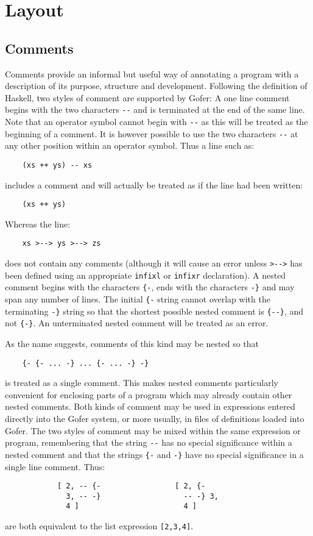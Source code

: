 \chapter{Layout}

\section{Comments}
Comments provide an informal but useful way  of  annotating  a  program
with  a  description  of  its  purpose,  structure   and   development.
Following  the  definition  of  Haskell,  two  styles  of  comment  are
supported by Gofer:
\BI
\IT  A one line comment begins with the  two  characters  \verb"--"  and  is
     terminated at the end of the same line.   Note  that  an  operator
     symbol cannot begin with \verb"--" as  this  will  be  treated  as  the
     beginning of a comment.  It is however possible  to  use  the  two
     characters \verb"--" at any other position within an  operator  symbol.
     Thus a line such as:
\begin{verbatim}
    (xs ++ ys) -- xs
\end{verbatim}
     includes a comment and will actually be treated as if the line had
     been written:
\begin{verbatim}
    (xs ++ ys)
\end{verbatim}
     Whereas the line:
\begin{verbatim}
    xs >--> ys >--> zs
\end{verbatim}
     does not contain any comments (although it  will  cause  an  error
     unless \verb">-->" has been defined  using  an  
     appropriate  \verb"infixl" or
     \verb"infixr" declaration).
\IT  A nested comment begins with the characters \verb"{-",  ends  with  the
     characters \verb"-}" and may span  any  number  of  lines.  The
     initial \verb"{-" string  
     cannot  overlap  with  the  terminating  \verb"-}"
     string so that the shortest possible nested comment is \verb"{--}", and
     not \verb"{-}".  An unterminated nested comment will be treated as  an
     error.

     As the name suggests, comments of this kind may be nested so  that
\begin{verbatim}
    {- {- ... -} ... {- ... -} -}
\end{verbatim}  
     is treated as  a  single  comment.
     This makes nested comments particularly convenient  for  enclosing
     parts  of  a  program  which  may  already  contain  other  nested
     comments.
\EI
Both kinds of comment may be used in expressions entered directly  into
the Gofer system, or more usually, in files of definitions loaded  into
Gofer.  The two  styles  of  comment  may  be  mixed  within  the  same
expression or program, remembering that the string \verb"--" has no  special
significance within a nested comment and that the strings \verb"{-" 
and \verb"-}"
have no special significance in a single line comment.  Thus:
\begin{verbatim}
            [ 2, -- {-                 [ 2, {-
              3, -- -}                   -- -} 3,
              4 ]                        4 ]
\end{verbatim}
are both equivalent to the list expression \verb"[2,3,4]".

